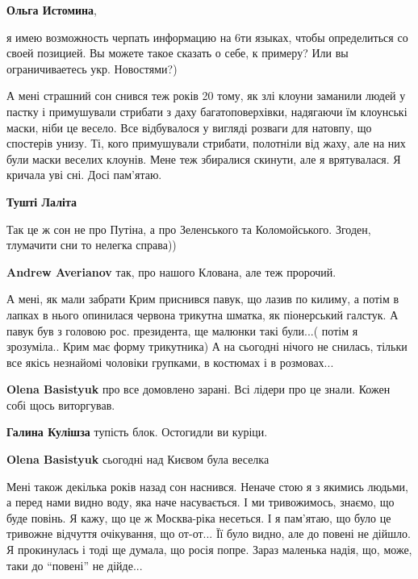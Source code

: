 \begin{itemize}
\begin{itemize}
\textbf{Ольга Истомина}, 

я имею возможность черпать информацию на 6ти языках, чтобы определиться со
своей позицией. Вы можете такое сказать о себе, к примеру? Или вы
ограничиваетесь укр. Новостями?)

\end{itemize} %


А мені страшний сон снився теж років 20 тому, як злі клоуни заманили людей у
пастку і примушували стрибати з даху багатоповерхівки, надягаючи їм клоунські
маски, ніби це весело. Все відбувалося у вигляді розваги для натовпу, що
спостерів унизу. Ті, кого примушували стрибати, полотніли від жаху, але на них
були маски веселих клоунів. Мене теж збиралися скинути, але я врятувалася. Я
кричала уві сні. Досі пам'ятаю.

\begin{itemize} %
\textbf{Тушті Лаліта}

Так це ж сон не про Путіна, а про Зеленського та Коломойського. Згоден,
тлумачити сни то нелегка справа))

\textbf{Andrew Averianov} так, про нашого Клована, але теж пророчий.
\end{itemize} %


А мені, як мали забрати Крим приснився павук, що лазив по килиму, а потім в
лапках в нього опинилася червона трикутна шматка, як піонерський галстук. А
павук був з головою рос. президента, ще малюнки такі були...( потім я
зрозуміла.. Крим має форму трикутника) А на сьогодні нічого не снилась, тільки
все якісь незнайомі чоловіки групками, в костюмах і в розмовах...

\begin{itemize} %
\textbf{Olena Basistyuk} про все домовлено зарані. Всі лідери про це знали. Кожен собі щось виторгував.

\textbf{Галина Кулішза} тупість блок. Остогидли ви куріци.

\textbf{Olena Basistyuk} сьогодні над Києвом була веселка
\end{itemize} %


Мені також декілька років назад сон наснився. Неначе стою я з якимись людьми, а
перед нами видно воду, яка наче насувається. І ми тривожимось, знаємо, що буде
повінь. Я кажу, що це ж Москва-ріка несеться. І я пам'ятаю, що було це тривожне
відчуття очікування, що от-от... Її було видно, але до повені не дійшло. Я
прокинулась і тоді ще думала, що росія попре. Зараз маленька надія, що, може,
таки до \enquote{повені} не дійде...


\end{itemize}
